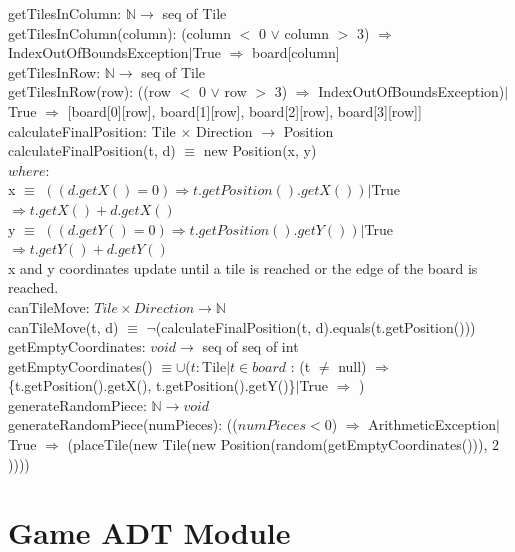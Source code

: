 \documentclass[12pt]{article}
\begin{document}
\noindent getTilesInColumn: $\mathbb{N} \rightarrow$ seq of Tile\\
\noindent getTilesInColumn(column): (column $<$ 0 $\lor$ column $>$ 3) $\Rightarrow$ IndexOutOfBoundsException$|$True $\Rightarrow$ board[column]\\

\noindent getTilesInRow: $\mathbb{N} \rightarrow$ seq of Tile\\
\noindent getTilesInRow(row): ((row $<$ 0 $\lor$ row $>$ 3) $\Rightarrow$ IndexOutOfBoundsException)$|$True $\Rightarrow$ [board[0][row], board[1][row], board[2][row], board[3][row]]\\

\noindent calculateFinalPosition: Tile $\times$ Direction $\rightarrow$ Position\\
\noindent calculateFinalPosition(t, d) $\equiv$ new Position(x, y)\\
$where$:\\
x $\equiv$ $((d.getX() = 0) \Rightarrow t.getPosition().getX())|$True $\Rightarrow t.getX() + d.getX()$\\
y $\equiv$ $((d.getY() = 0) \Rightarrow t.getPosition().getY())|$True $\Rightarrow t.getY() + d.getY()$\\
\noindent x and y coordinates update until a tile is reached or the edge of the board is reached.\\

\noindent canTileMove: $Tile \times Direction \rightarrow \mathbb{N}$\\
\noindent canTileMove(t, d) $\equiv$ $\neg$(calculateFinalPosition(t, d).equals(t.getPosition()))\\

\noindent getEmptyCoordinates: $void \rightarrow $ seq of seq of int\\
\noindent getEmptyCoordinates() $\equiv \cup$($t : $Tile$|t \in board$ : (t $\neq$ null) $\Rightarrow$ \{t.getPosition().getX(), t.getPosition().getY()\}$|$True $\Rightarrow$ {})\\

\noindent generateRandomPiece: $\mathbb{N} \rightarrow void$\\
\noindent generateRandomPiece(numPieces): (($numPieces < 0$) $\Rightarrow$ ArithmeticException$|$True $\Rightarrow$ (placeTile(new Tile(new Position(random(getEmptyCoordinates())), $2$))))\\

\newpage

\section* {Game ADT Module}
\end{document}
